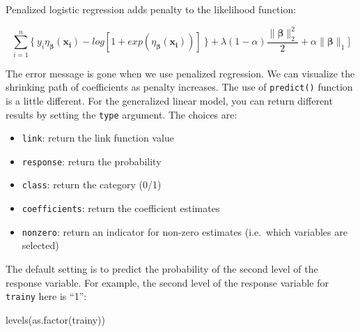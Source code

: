 \documentclass[
  12pt,
]{krantz}
\makeatletter
\newenvironment{Shaded}{\begin{snugshade}}{\end{snugshade}}
\newcommand{\AttributeTok}[1]{\textcolor[rgb]{0.61,0.61,0.61}{#1}}
\newcommand{\FunctionTok}[1]{\textcolor[rgb]{0,0,0}{#1}}
\newcommand{\NormalTok}[1]{#1}
\newcommand{\OtherTok}[1]{\textcolor[rgb]{0.37,0.37,0.37}{#1}}
\newcommand{\SpecialCharTok}[1]{\textcolor[rgb]{0,0,0}{#1}}
\newcommand{\StringTok}[1]{\textcolor[rgb]{0.5,0.5,0.5}{#1}}
\providecommand{\tightlist}{%
  \setlength{\itemsep}{0pt}\setlength{\parskip}{0pt}}
\newenvironment{kframe}{%
\medskip{}
\setlength{\fboxsep}{.8em}
 \def\at@end@of@kframe{}%
 \ifinner\ifhmode%
  \def\at@end@of@kframe{\end{minipage}}%
  \begin{minipage}{\columnwidth}%
 \fi\fi%
 \def\FrameCommand##1{\hskip\@totalleftmargin \hskip-\fboxsep
 \colorbox{shadecolor}{##1}\hskip-\fboxsep
     \hskip-\linewidth \hskip-\@totalleftmargin \hskip\columnwidth}%
 \MakeFramed {\advance\hsize-\width
   \@totalleftmargin\z@ \linewidth\hsize
   \@setminipage}}%
 {\par\unskip\endMakeFramed%
 \at@end@of@kframe}
\renewenvironment{Shaded}{\begin{kframe}}{\end{kframe}}
\makeatother
\begin{document}
Penalized logistic regression adds penalty to the likelihood function:

\[
\sum_{i=1}^{n}\{\ y_{i}\eta_{\symbf{\beta}}(\mathbf{x_{i}})-log[1+exp(\eta_{\symbf{\beta}}(\mathbf{x_{i}}))]\ \}+\lambda (1-\alpha) \frac{\parallel \symbf{\beta}\parallel_{2}^{2}}{2} + \alpha \parallel \symbf{\beta}\parallel _{1} ]
\]

\begin{Shaded}
\end{Shaded}

The error message is gone when we use penalized regression. We can visualize the shrinking path of coefficients as penalty increases. The use of \texttt{predict()} function is a little different. For the generalized linear model, you can return different results by setting the \texttt{type} argument. The choices are:

\begin{itemize}
\tightlist
\item
  \texttt{link}: return the link function value
\item
  \texttt{response}: return the probability
\item
  \texttt{class}: return the category (0/1)
\item
  \texttt{coefficients}: return the coefficient estimates
\item
  \texttt{nonzero}: return an indicator for non-zero estimates (i.e.~which variables are selected)
\end{itemize}

The default setting is to predict the probability of the second level of the response variable. For example, the second level of the response variable for \texttt{trainy} here is ``1'':

\begin{Shaded}
\begin{Highlighting}[]
\FunctionTok{levels}\NormalTok{(}\FunctionTok{as.factor}\NormalTok{(trainy))}
\end{Highlighting}
\end{Shaded}
\end{document}

